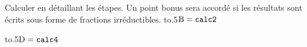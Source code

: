 \documentclass[exercice]{thedocument}%
\begin{document}
%
Calculer en détaillant les étapes. Un point bonus sera accordé si les résultats
sont écrits sous forme de fractions irréductibles.\vskip10pt\noindent
\hbox{\hbox to.5\hbox{$\text{B}=\<calc2;$\hfill}}\par\vskip5pt
\hbox{\hbox to.5\hbox{$\text{D}=\<calc4;$\hfill}}\par
\end{document}
